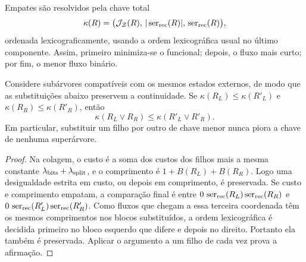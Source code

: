 Empates são resolvidos pela chave total
\begin{equation}
 \kappa(R)=
 \bigl(\mathcal{J}_{\mathcal Z}(R),\,
       |\operatorname{ser}_{\rm rec}(R)|,\,
       \operatorname{ser}_{\rm rec}(R)\bigr),
 \label{eq:tie-key}
\end{equation}
ordenada lexicograficamente, usando a ordem lexicográfica usual no último
componente. Assim, primeiro minimiza-se o funcional; depois, o fluxo mais
curto; por fim, o menor fluxo binário.

\begin{lemma}
\label{lem:tie-concatenation}
Considere subárvores compatíveis com os mesmos estados externos, de modo que
as substituições abaixo preservem a continuidade. Se
$\kappa(R_L)\le\kappa(R'_L)$ e $\kappa(R_R)\le\kappa(R'_R)$, então
\[
 \kappa(R_L\vee R_R)\le\kappa(R'_L\vee R'_R).
\]
Em particular, substituir um filho por outro de chave menor nunca piora a
chave de nenhuma superárvore.
\end{lemma}

\begin{proof}
Na colagem, o custo é a soma dos custos dos filhos mais a mesma constante
$\lambda_{\rm bits}+\lambda_{\rm split}$, e o comprimento é
$1+B(R_L)+B(R_R)$. Logo uma desigualdade estrita em custo, ou depois em
comprimento, é preservada. Se custo e comprimento empatam, a comparação final
é entre
$0\,\operatorname{ser}_{\rm rec}(R_L)\operatorname{ser}_{\rm rec}(R_R)$ e
$0\,\operatorname{ser}_{\rm rec}(R'_L)\operatorname{ser}_{\rm rec}(R'_R)$. Como fluxos que chegam a essa
terceira coordenada têm os mesmos comprimentos nos blocos substituídos, a
ordem lexicográfica é decidida primeiro no bloco esquerdo que difere e depois
no direito. Portanto ela também é preservada. Aplicar o argumento a um filho
de cada vez prova a afirmação.
\end{proof}
